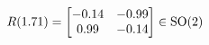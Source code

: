 \documentclass[preview]{standalone}
\begin{document}
\begin{align*}
\special{dvisvgm:raw <g id='unique000'>}R(1.71) = \begin{bmatrix} -0.14 & -0.99 \\ 0.99 & -0.14 \end{bmatrix} \in \text{SO}(2)\special{dvisvgm:raw </g>}
\end{align*}
\end{document}
